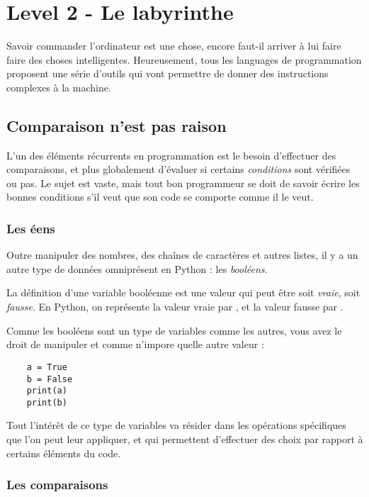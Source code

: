 \chapter{Level 2 - Le labyrinthe}

Savoir commander l'ordinateur est une chose, encore faut-il arriver à lui faire faire des choses intelligentes. Heureusement, tous les languages de programmation proposent une série d'outils qui vont permettre de donner des instructions complexes à la machine.

\section{Comparaison n'est pas raison}

L'un des éléments récurrents en programmation est le besoin d'effectuer des comparaisons, et plus globalement d'évaluer si certains \emph{conditions} sont vérifiées ou pas. Le sujet est vaste, mais tout bon programmeur se doit de savoir écrire les bonnes conditions s'il veut que son code se comporte comme il le veut.

\subsection{Les éens}

Outre manipuler des nombres, des chaînes de caractères et autres listes, il y a un autre type de données omniprésent en Python : les \emph{booléens}.

La définition d'une variable booléenne est une valeur qui peut être soit \emph{vraie}, soit \emph{fausse}. En Python, on représente la valeur vraie par , et la valeur fausse par .

Comme les booléens sont un type de variables comme les autres, vous avez le droit de manipuler  et  comme n'impore quelle autre valeur :

\begin{lstlisting}
    a = True
    b = False
    print(a)
    print(b)
\end{lstlisting}

Tout l'intérêt de ce type de variables va résider dans les opérations spécifiques que l'on peut leur appliquer, et qui permettent d'effectuer des choix par rapport à certains éléments du code.

\subsection{Les comparaisons}

